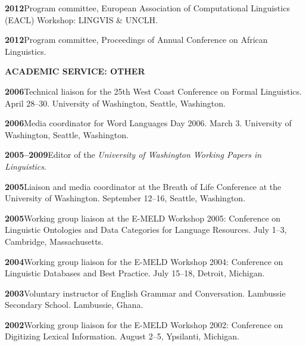 \documentclass[11pt]{article}
\newcommand{\hangpara}{
 \setlength{\parindent}{0in} %
 \hangindent=0.42in %
}
\begin{document}
\vskip 6pt
\hangpara
{\bf 2012}\hspace{1ex}Program committee, European Association of Computational Linguistics (EACL) Workshop: LINGVIS \& UNCLH.

\vskip 6pt
\hangpara
{\bf 2012}\hspace{1ex}Program committee, Proceedings of Annual Conference on African Linguistics.


\vskip 20pt
\begin{flushleft}
{\bf ACADEMIC SERVICE: OTHER}
\end{flushleft}

\hangpara
{\bf 2006}\hspace{1ex}Technical liaison for the 25th West Coast Conference on Formal Linguistics. April 28--30. University of Washington, Seattle, Washington.

\vskip 6pt
\hangpara
{\bf 2006}\hspace{1ex}Media coordinator for Word Languages Day 2006. March 3. University of Washington, Seattle, Washington.	

\vskip 6pt
\hangpara
{\bf 2005--2009}\hspace{1ex}Editor of the \textit{University of Washington Working Papers in Linguistics}.

\vskip 6pt
\hangpara
{\bf 2005}\hspace{1ex}Liaison and media coordinator at the Breath of Life Conference at the University of Washington. September 12--16, Seattle, Washington.

\vskip 6pt
\hangpara
{\bf 2005}\hspace{1ex}Working group liaison at the E-MELD Workshop 2005: Conference on Linguistic Ontologies and Data Categories for Language Resources. July 1--3, Cambridge, Massachusetts.

\vskip 6pt
\hangpara
{\bf 2004}\hspace{1ex}Working group liaison for the E-MELD Workshop 2004: Conference on Linguistic Databases and Best Practice. July 15--18, Detroit, Michigan.

\vskip 6pt
\hangpara
{\bf 2003}\hspace{1ex}Voluntary instructor of English Grammar and Conversation. Lambussie Secondary School. Lambussie, Ghana.

\vskip 6pt
\hangpara
{\bf 2002}\hspace{1ex}Working group liaison for the E-MELD Workshop 2002: Conference on Digitizing Lexical Information. August 2--5, Ypsilanti, Michigan.
\end{document}
